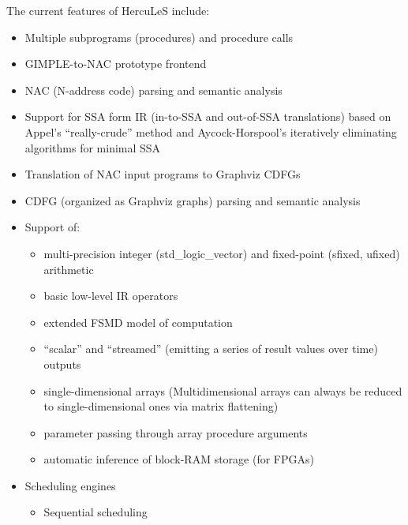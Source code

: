 \documentclass[a4paper]{article}
\begin{document}
The current features of HercuLeS include:
%
\begin{itemize}

\item Multiple subprograms (procedures) and procedure calls

\item GIMPLE-to-NAC prototype frontend

\item NAC (N-address code) parsing and semantic analysis

\item Support for SSA form IR (in-to-SSA and out-of-SSA translations) based on
Appel's ``really-crude'' method and Aycock-Horspool's iteratively eliminating
algorithms for minimal SSA

\item Translation of NAC input programs to Graphviz CDFGs

\item CDFG (organized as Graphviz graphs) parsing and semantic analysis

\item Support of:
%
\begin{itemize}

\item multi-precision integer (std\_logic\_vector) and fixed-point (sfixed, ufixed)
arithmetic

\item basic low-level IR operators

\item extended FSMD model of computation

\item ``scalar'' and ``streamed'' (emitting a series of result values over time) outputs

\item single-dimensional arrays (Multidimensional arrays can always be reduced to
single-dimensional ones via matrix flattening)

\item parameter passing through array procedure arguments

\item automatic inference of block-RAM storage (for FPGAs)

\end{itemize}

\item Scheduling engines
%
\begin{itemize}

\item Sequential scheduling


\end{itemize}
\end{itemize}
\end{document}
